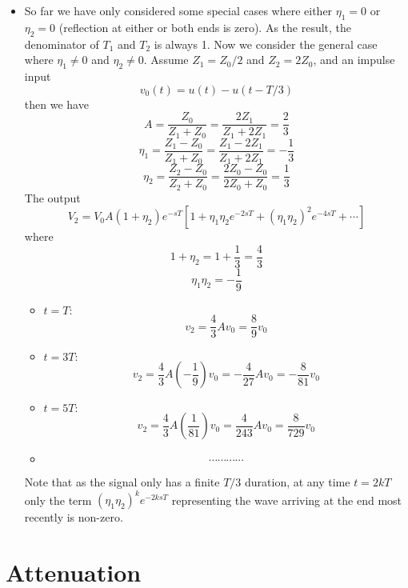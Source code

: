 \begin{itemize}

\item So far we have only considered some special cases where either
$\eta_1=0$ or $\eta_2=0$ (reflection at either or both ends is
zero). As the result, the denominator of $T_1$ and $T_2$ is always 1.
Now we consider the general case where $\eta_1\ne 0$ and $\eta_2 
\ne 0$. Assume $Z_1=Z_0/2$ and $Z_2=2Z_0$, and an impulse input
\[	v_0(t)=u(t)-u(t-T/3)	\]
then we have
\[ A=\frac{Z_0}{Z_1+Z_0}=\frac{2Z_1}{Z_1+2Z_1}=\frac{2}{3} \]
\[ \eta_1=\frac{Z_1-Z_0}{Z_1+Z_0}=\frac{Z_1-2Z_1}{Z_1+2Z_1}=-\frac{1}{3} \]
\[ \eta_2=\frac{Z_2-Z_0}{Z_2+Z_0}=\frac{2Z_0-Z_0}{2Z_0+Z_0}=\frac{1}{3}  \]
The output 
\[	V_2=V_0A(1+\eta_2)e^{-sT}[1+\eta_1\eta_2 e^{-2sT}
	+(\eta_1\eta_2)^2 e^{-4sT}+\cdots ]	\]
where
\[	1+\eta_2=1+\frac{1}{3}=\frac{4}{3}	\]
\[ 	\eta_1 \eta_2=-\frac{1}{9}	\]
\begin{itemize}
\item $t=T:$ 
\[	v_2=\frac{4}{3}Av_0=\frac{8}{9}v_0	\]
\item $t=3T:$ 
\[ v_2=\frac{4}{3}A\left(-\frac{1}{9}\right)v_0=-\frac{4}{27}Av_0=-\frac{8}{81}v_0 \]
\item $t=5T:$ 
\[ v_2=\frac{4}{3}A\left(\frac{1}{81}\right)v_0=\frac{4}{243}Av_0=\frac{8}{729}v_0	\]
\item
\[	\cdots  \cdots  \cdots  \cdots  \]
\end{itemize}
Note that as the signal only has a finite $T/3$ duration, at any time $t=2kT$
only the term $(\eta_1\eta_2)^k e^{-2ksT}$ representing the wave arriving at
the end most recently is non-zero.

\end{itemize}

\newpage
\section*{Attenuation}

